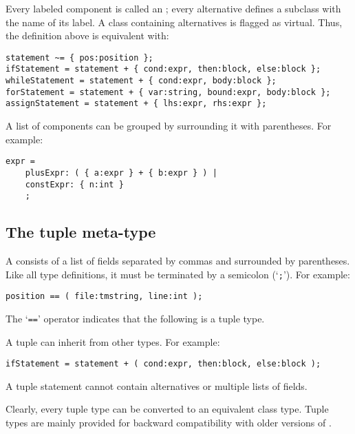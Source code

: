 Every labeled component is called an ;
every alternative defines a subclass with the name of its label.
A class containing alternatives is flagged as virtual.
Thus, the definition above is equivalent with:
\begin{showfile}
\begin{verbatim}
statement ~= { pos:position };
ifStatement = statement + { cond:expr, then:block, else:block };
whileStatement = statement + { cond:expr, body:block };
forStatement = statement + { var:string, bound:expr, body:block };
assignStatement = statement + { lhs:expr, rhs:expr };
\end{verbatim}
\end{showfile}
\par
A list of components can be grouped by surrounding it with parentheses.
For example:
\begin{showfile}
\begin{verbatim}
expr =
    plusExpr: ( { a:expr } + { b:expr } ) |
    constExpr: { n:int }
    ;
\end{verbatim}
\end{showfile}
\subsection{The tuple meta-type}
A  consists of a list of fields separated by commas and
surrounded by parentheses.
Like all type definitions, it must be terminated by a semicolon (`\verb';'').
For example:
\begin{showfile}
\begin{verbatim}
position == ( file:tmstring, line:int );
\end{verbatim}
\end{showfile}
The `\verb'=='' operator indicates that the following is a tuple type.
\par
A tuple can inherit from other types. For example:
\begin{showfile}
\begin{verbatim}
ifStatement = statement + ( cond:expr, then:block, else:block );
\end{verbatim}
\end{showfile}
A tuple statement cannot contain alternatives or multiple lists of fields.
\par
Clearly, every tuple type can be converted to an equivalent class type.
Tuple types are mainly provided for backward compatibility with
older versions of {\Tm}.
